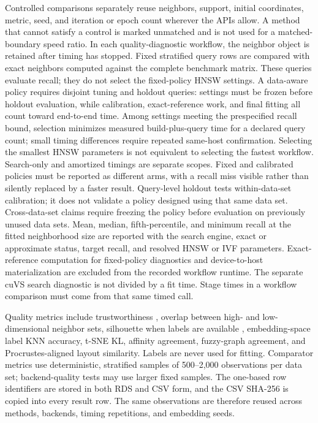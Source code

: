 \documentclass[article]{jss}
\newcommand{\fastEmbedR}{\pkg{fastEmbedR}\xspace}
\begin{document}
Controlled comparisons separately reuse neighbors, support, initial
coordinates, metric, seed, and iteration or epoch count wherever the APIs
allow. A method that cannot satisfy a control is marked unmatched and is not
used for a matched-boundary speed ratio. In each \fastEmbedR quality-diagnostic
workflow, the neighbor object is retained after timing has stopped. Fixed
stratified query rows are
compared with exact neighbors computed against the complete benchmark matrix.
These queries evaluate recall; they do not select the fixed-policy HNSW
settings. A data-aware policy requires disjoint tuning and holdout queries:
settings must be frozen before holdout evaluation, while calibration,
exact-reference work, and final fitting all count toward end-to-end time.
Among settings meeting the prespecified recall bound, selection minimizes
measured build-plus-query time for a declared query count; small timing
differences require repeated same-host confirmation. Selecting the smallest
HNSW parameters is not equivalent to selecting the fastest workflow.
Search-only and amortized timings are separate scopes. Fixed and calibrated
policies must be reported as different arms, with a recall miss visible
rather than silently replaced by a faster result. Query-level holdout tests
within-data-set calibration; it does not validate a policy designed using
that same data set. Cross-data-set claims require freezing the policy before
evaluation on previously unused data sets.
Mean, median, fifth-percentile, and minimum recall at the fitted neighborhood
size are reported with the search engine, exact or approximate status, target
recall, and resolved HNSW or IVF parameters. Exact-reference computation for
fixed-policy diagnostics and device-to-host materialization are excluded from
the recorded workflow runtime. The
separate cuVS search diagnostic is not divided by a fit time. Stage
times in a workflow comparison must come from that same timed call.

Quality metrics include trustworthiness \citep{venna2001}, overlap between
high- and low-dimensional neighbor sets, silhouette when labels are available
\citep{rousseeuw1987}, embedding-space label KNN accuracy, t-SNE KL, affinity
agreement, fuzzy-graph agreement, and Procrustes-aligned layout similarity.
Labels are never used for fitting. Comparator metrics use deterministic,
stratified samples of 500--2,000 observations per data set; backend-quality
tests may use larger fixed samples. The one-based row
identifiers are stored in both RDS and CSV form, and the CSV SHA-256 is copied
into every result row. The same observations are therefore reused across
methods, backends, timing repetitions, and embedding seeds.
\end{document}
